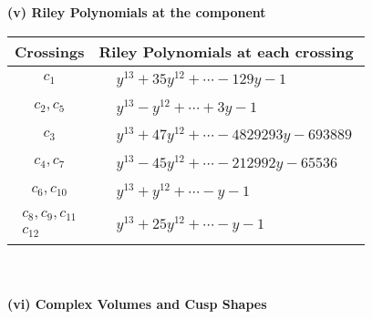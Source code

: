\documentclass[1p]{elsarticle_modified}
\theoremstyle{definition}
\begin{document}
\newpage\renewcommand{\arraystretch}{1}
\flushleft \textbf{(v) Riley Polynomials at the component}\newline \\
\begin{tabular}{m{50pt}|m{274pt}}
Crossings & \hspace{64pt}Riley Polynomials at each crossing \\
\hline $$\begin{aligned}c_{1}\end{aligned}$$&$\begin{aligned}
&y^{13}+35 y^{12}+\cdots-129 y-1
\end{aligned}$\\
\hline $$\begin{aligned}c_{2},c_{5}\end{aligned}$$&$\begin{aligned}
&y^{13}- y^{12}+\cdots+3 y-1
\end{aligned}$\\
\hline $$\begin{aligned}c_{3}\end{aligned}$$&$\begin{aligned}
&y^{13}+47 y^{12}+\cdots-4829293 y-693889
\end{aligned}$\\
\hline $$\begin{aligned}c_{4},c_{7}\end{aligned}$$&$\begin{aligned}
&y^{13}-45 y^{12}+\cdots-212992 y-65536
\end{aligned}$\\
\hline $$\begin{aligned}c_{6},c_{10}\end{aligned}$$&$\begin{aligned}
&y^{13}+y^{12}+\cdots- y-1
\end{aligned}$\\
\hline $$\begin{aligned}c_{8},c_{9},c_{11}\\c_{12}\end{aligned}$$&$\begin{aligned}
&y^{13}+25 y^{12}+\cdots- y-1
\end{aligned}$\\
\hline
\end{tabular}\\~\\
\newpage\flushleft \textbf{(vi) Complex Volumes and Cusp Shapes}
\end{document}
